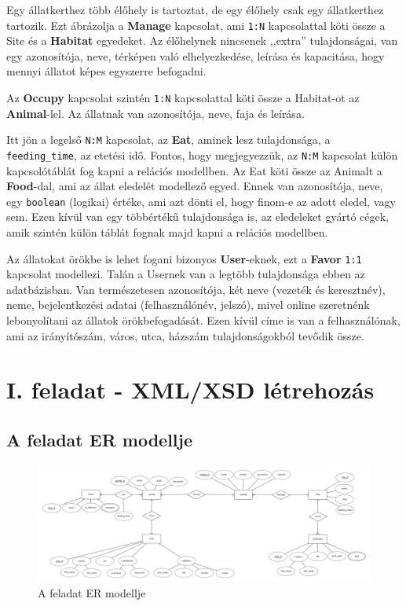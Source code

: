 \documentclass[12pt]{report}
\begin{document}
Egy állatkerthez több élőhely is tartoztat, de egy élőhely csak egy állatkerthez tartozik. Ezt ábrázolja a \textbf{Manage} kapcsolat, ami \texttt{1:N} kapcsolattal köti össze a Site és a \textbf{Habitat} egyedeket. Az élőhelynek nincsenek ,,extra'' tulajdonságai, van egy azonosítója, neve, térképen való elhelyezkedése, leírása és kapacitása, hogy mennyi állatot
képes egyszerre befogadni.

Az \textbf{Occupy} kapcsolat szintén \texttt{1:N} kapcsolattal köti össze a Habitat-ot az \textbf{Animal}-lel. Az állatnak van azonosítója, neve, faja és leírása.

Itt jön a legelső \texttt{N:M} kapcsolat, az \textbf{Eat}, aminek lesz tulajdonsága, a \texttt{feeding\_time}, az etetési idő. Fontos, hogy megjegyezzük, az \texttt{N:M} kapcsolat külön kapcsolótáblát fog kapni a relációs modellben. Az Eat köti össze az Animalt
a \textbf{Food}-dal, ami az állat eledelét modellező egyed. Ennek van azonosítója, neve, egy \texttt{boolean} (logikai) értéke, ami azt dönti el, hogy finom-e az adott eledel, vagy sem. Ezen kívül van egy többértékű tulajdonsága is, az eledeleket gyártó cégek, amik szintén külön táblát fognak majd kapni a relációs modellben.

Az állatokat örökbe is lehet fogani bizonyos \textbf{User}-eknek, ezt a \textbf{Favor} \texttt{1:1} kapcsolat modellezi. Talán a Usernek
van a legtöbb tulajdonsága ebben az adatbázisban. Van természetesen azonosítója, két neve (vezeték és keresztnév), neme, bejelentkezési adatai (felhasználónév, jelszó), mivel online szeretnénk lebonyolítani az állatok örökbefogadását. Ezen kívül címe is van a felhasználónak, ami az irányítószám, város, utca, házszám tulajdonságokból tevődik össze.

\chapter{I. feladat - XML/XSD létrehozás}

\section[ER modell]{A feladat ER modellje}

\begin{figure}[h]
	\centering
	\includegraphics[width=0.999\linewidth]{ERKLNSPG.png}
	\caption{A feladat ER modellje}
\end{figure}
\end{document}
